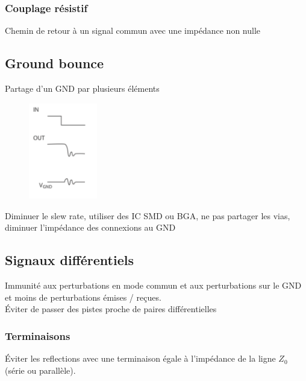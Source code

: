 \documentclass[resume]{subfiles}
\begin{document}
\begin{multicols}{3}
\subsubsection{Couplage résistif}
Chemin de retour à un signal commun avec une impédance non nulle
\subsection{Ground bounce}
Partage d'un GND par plusieurs éléments
\begin{figure}[H]
\centering
\includegraphics[width=3.00cm]{img_21.png}
\end{figure}
Diminuer le slew rate, utiliser des IC SMD ou BGA, ne pas partager les vias, diminuer l'impédance des connexions au GND
\subsection{Signaux différentiels}
Immunité aux perturbations en mode commun et aux perturbations sur le GND et moins de perturbations émises / reçues.\\
Éviter de passer des pistes proche de paires différentielles
\subsubsection{Terminaisons}
Éviter les reflections avec une terminaison égale à l'impédance de la ligne $Z_0$ (série ou parallèle).\\

\end{multicols}
\end{document}
